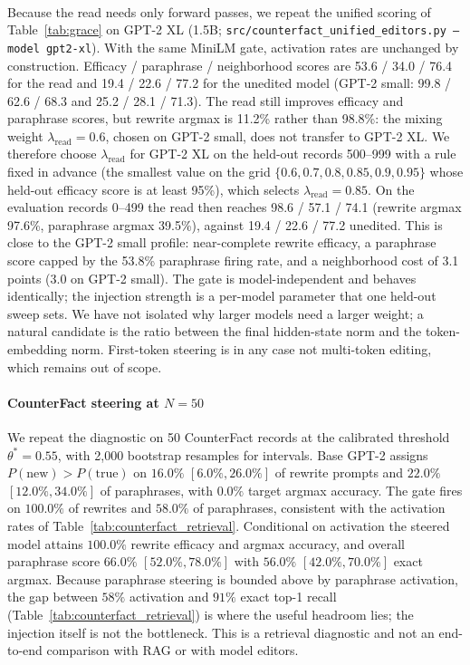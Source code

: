\documentclass[preprint,12pt]{elsarticle}
\newif\ifmarkchanges %
\newcommand{\rev}[1]{\ifmarkchanges{\color{blue}#1}\else#1\fi} %
\providecommand{\DIFaddtex}[1]{{\protect\color{blue}\uwave{#1}}} %
\providecommand{\DIFaddbegin}{} %
\providecommand{\DIFaddend}{} %
\providecommand{\DIFadd}[1]{\texorpdfstring{\DIFaddtex{#1}}{#1}} %
\providecommand{\DIFaddincludegraphics}[2][]{{\color{blue}\fbox{\DIFOincludegraphics[#1]{#2}}}} %
\DeclareRobustCommand{\DIFaddbegin}{\DIFOaddbegin \let\includegraphics\DIFaddincludegraphics} %
\DeclareRobustCommand{\DIFaddend}{\DIFOaddend \let\includegraphics\DIFOincludegraphics} %
\begin{document}
\DIFaddbegin \paragraph{\DIFadd{Scale}}
\rev{Because the read needs only forward passes, we repeat the unified scoring of Table~\ref{tab:grace} on GPT-2 XL (1.5B; \texttt{src/counterfact\_unified\_editors.py --model gpt2-xl}). With the same MiniLM gate, activation rates are unchanged by construction. Efficacy / paraphrase / neighborhood scores are 53.6 / 34.0 / 76.4 for the read and 19.4 / 22.6 / 77.2 for the unedited model (GPT-2 small: 99.8 / 62.6 / 68.3 and 25.2 / 28.1 / 71.3). The read still improves efficacy and paraphrase scores, but rewrite argmax is 11.2\% rather than 98.8\%: the mixing weight $\lambda_{\mathrm{read}}=0.6$, chosen on GPT-2 small, does not transfer to GPT-2 XL. We therefore choose $\lambda_{\mathrm{read}}$ for GPT-2 XL on the held-out records 500--999 with a rule fixed in advance (the smallest value on the grid $\{0.6,0.7,0.8,0.85,0.9,0.95\}$ whose held-out efficacy score is at least 95\%), which selects $\lambda_{\mathrm{read}}=0.85$. On the evaluation records 0--499 the read then reaches 98.6 / 57.1 / 74.1 (rewrite argmax 97.6\%, paraphrase argmax 39.5\%), against 19.4 / 22.6 / 77.2 unedited. This is close to the GPT-2 small profile: near-complete rewrite efficacy, a paraphrase score capped by the 53.8\% paraphrase firing rate, and a neighborhood cost of 3.1 points (3.0 on GPT-2 small). The gate is model-independent and behaves identically; the injection strength is a per-model parameter that one held-out sweep sets. We have not isolated why larger models need a larger weight; a natural candidate is the ratio between the final hidden-state norm and the token-embedding norm. First-token steering is in any case not multi-token editing, which remains out of scope.}

\DIFaddend \paragraph{CounterFact steering at $N=50$}
We repeat the diagnostic on 50 CounterFact records at the calibrated threshold $\theta^* = 0.55$, with 2,000 bootstrap resamples for intervals. Base GPT-2 assigns $P(\mathrm{new}) > P(\mathrm{true})$ on $16.0\%$ $[6.0\%, 26.0\%]$ of rewrite prompts and $22.0\%$ $[12.0\%, 34.0\%]$ of paraphrases, with $0.0\%$ target argmax accuracy. The gate fires on $100.0\%$ of rewrites and $58.0\%$ of paraphrases, consistent with the activation rates of Table~\ref{tab:counterfact_retrieval}. Conditional on activation the steered model attains $100.0\%$ rewrite efficacy and argmax accuracy, and overall paraphrase score $66.0\%$ $[52.0\%, 78.0\%]$ with $56.0\%$ $[42.0\%, 70.0\%]$ exact argmax. Because paraphrase steering is bounded above by paraphrase activation, the gap between $58\%$ activation and $91\%$ exact top-1 recall (Table~\ref{tab:counterfact_retrieval}) is where the useful headroom lies; the injection itself is not the bottleneck. This is a retrieval diagnostic and not an end-to-end comparison with RAG or with model editors.
\end{document}
